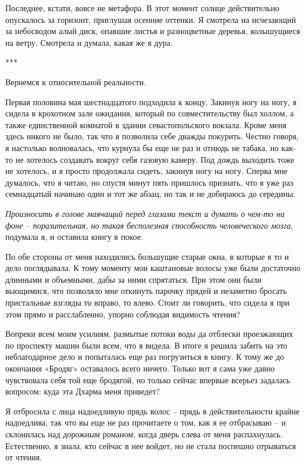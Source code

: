 \documentclass[
]{book}
\begin{document}
Последнее, кстати, вовсе не метафора. В этот момент солнце действительно опускалось за горизонт, приглушая осенние оттенки. Я смотрела на исчезающий за небосводом алый диск, опавшие листья и разноцветные деревья, колышущиеся на ветру. Смотрела и думала, какая же я дура.

***

Вернемся к относительной реальности.

Первая половина мая шестнадцатого подходила к концу. Закинув ногу на ногу, я сидела в крохотном зале ожидания, который по совместительству был холлом, а также единственной комнатой в здании севастопольского вокзала. Кроме меня здесь никого не было, так что я позволила себе дважды покурить. Честно говоря, я настолько волновалась, что курнула бы еще не раз и отнюдь не табака, но как-то не хотелось создавать вокруг себя газовую камеру. Под дождь выходить тоже не хотелось, и я просто продолжала сидеть, закинув ногу на ногу. Сперва мне думалось, что я читаю, но спустя минут пять пришлось признать, что я уже раз семнадцатый начинаю один и тот же абзац, но так и не добираюсь до середины.

\emph{Произносить в голове маячащий перед глазами текст и думать о чем-то на фоне -- поразительная, но такая бесполезная способность человеческого мозга}, подумала я, и оставила книгу в покое.

По обе стороны от меня находились большущие старые окна, в которые я то и дело поглядывала. К тому моменту мои каштановые волосы уже были достаточно длинными и объемными, дабы за ними спрятаться. При этом они были вьющимися, что позволяло мне откинуть парочку прядей и незаметно бросать пристальные взгляды то вправо, то влево. Стоит ли говорить, что сидела я при этом прямо и расслабленно, упорно соблюдая видимость чтения?

Вопреки всем моим усилиям, размытые потоки воды да отблески проезжающих по проспекту машин были всем, что я видела. В итоге я решила забить на это неблагодарное дело и попыталась еще раз погрузиться в книгу. К тому же до окончания «Бродяг» оставалось всего ничего. Только вот я сама уже давно чувствовала себя той еще бродягой, но только сейчас впервые всерьез задалась вопросом: куда эта Дхарма меня приведет?

Я отбросила с лица надоедливую прядь волос -- прядь в действительности крайне надоедлива, так что вы еще не раз прочитаете о том, как я ее отбрасываю -- и склонилась над дорожным романом, когда дверь слева от меня распахнулась. Естественно, я знала, кто сейчас в нее войдет, но не стала поспешно отрываться от чтения.
\end{document}
